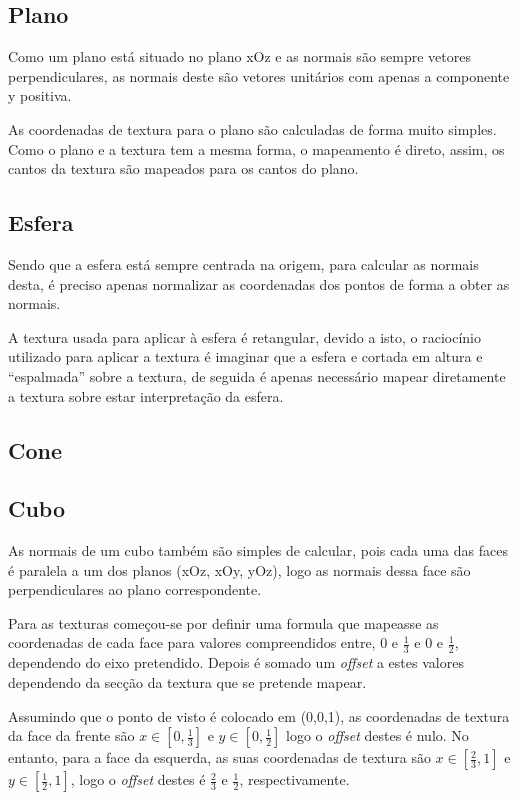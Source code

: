 \documentclass[a4paper]{article}
\begin{document}
\subsection{Plano}
Como um plano está situado no plano xOz e as normais são sempre vetores
perpendiculares, as normais deste são vetores unitários com apenas a componente
y positiva.

As coordenadas de textura para o plano são calculadas de forma
muito simples. Como o plano e a textura tem a mesma forma, o mapeamento é
direto, assim, os cantos da textura são mapeados para os cantos do plano.

\subsection{Esfera}\label{sec:esfera}
Sendo que a esfera está sempre centrada na origem, para calcular as normais
desta, é preciso apenas normalizar as coordenadas dos pontos de forma a obter
as normais.

A textura usada para aplicar à esfera é retangular, devido a isto, o raciocínio
utilizado para aplicar a textura é imaginar que a esfera e cortada em altura e
``espalmada'' sobre a textura, de seguida é apenas necessário mapear
diretamente a textura sobre estar interpretação da esfera.

\subsection{Cone}

\subsection{Cubo}
As normais de um cubo também são simples de calcular, pois cada uma das faces é
paralela a um dos planos (xOz, xOy, yOz), logo as normais dessa face são
perpendiculares ao plano correspondente.

Para as texturas começou-se por definir uma formula que mapeasse as coordenadas
de cada face para valores compreendidos entre, 0 e $\frac{1}{3}$ e 0 e
$\frac{1}{2}$, dependendo do eixo pretendido. Depois é somado um
\textit{offset} a estes valores dependendo da secção da textura que se pretende
mapear.

Assumindo que o ponto de visto é colocado em (0,0,1), as coordenadas de textura
da face da frente são $x \in [0,\frac{1}{3}]$ e $y \in [0,\frac{1}{2}]$ logo o
\textit{offset} destes é nulo. No entanto, para a face da esquerda, as suas
coordenadas de textura são $x \in [\frac{2}{3},1]$ e $y \in [\frac{1}{2},1]$,
logo o \textit{offset} destes é $\frac{2}{3}$ e $\frac{1}{2}$, respectivamente.
\end{document}
